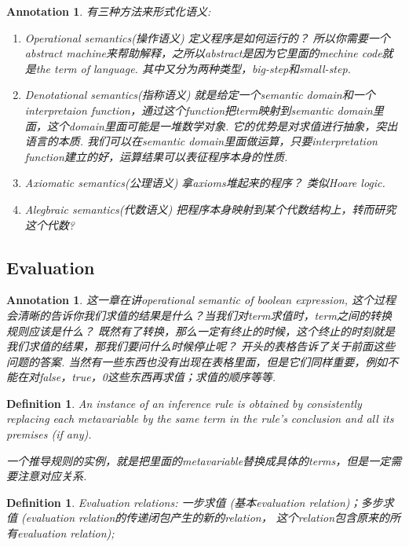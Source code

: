 \documentclass{article}
\theoremstyle{plain}
\newtheorem{definition}[theorem]{Definition}
\newtheorem{annotation}[theorem]{Annotation}
\theoremstyle{nonumberplain}
\begin{document}
\begin{annotation}
\rm 有三种方法来形式化语义:
\begin{enumerate}
	\item Operational semantics(操作语义) 定义程序是如何运行的？ 所以你需要一个abstract machine来帮助解释，之所以abstract是因为它里面的mechine code就是the term of language. 其中又分为两种类型，big-step和small-step.
	\item Denotational semantics(指称语义) 就是给定一个semantic domain和一个interpretaion function，通过这个function把term映射到semantic domain里面，这个domain里面可能是一堆数学对象. 它的优势是对求值进行抽象，突出语言的本质. 我们可以在semantic domain里面做运算，只要interpretation function建立的好，运算结果可以表征程序本身的性质.
	\item Axiomatic semantics(公理语义) 拿axioms堆起来的程序？ 类似Hoare logic.
	\item Alegbraic semantics(代数语义) 把程序本身映射到某个代数结构上，转而研究这个代数?
\end{enumerate}
\end{annotation}

\newpage
\subsection{Evaluation}

\begin{annotation}
\rm 这一章在讲operational semantic of boolean expression, 这个过程会清晰的告诉你我们求值的结果是什么？当我们对term求值时，term之间的转换规则应该是什么？ 既然有了转换，那么一定有终止的时候，这个终止的时刻就是我们求值的结果，那我们要问什么时候停止呢？ 开头的表格告诉了关于前面这些问题的答案. 当然有一些东西也没有出现在表格里面，但是它们同样重要，例如不能在对false，true，0这些东西再求值；求值的顺序等等.
\end{annotation}


\begin{definition}
\rm An instance of an inference rule is obtained by consistently replacing each metavariable by the same term in the rule’s conclusion and all its premises (if any).

{\color{blue} 一个推导规则的实例，就是把里面的metavariable替换成具体的terms，但是一定需要注意对应关系}.
\end{definition}


\begin{definition}
\rm Evaluation relations: 一步求值 (基本evaluation relation)；多步求值 (evaluation relation的传递闭包产生的新的relation， 这个relation包含原来的所有evaluation relation);
\end{definition}
\end{document}
